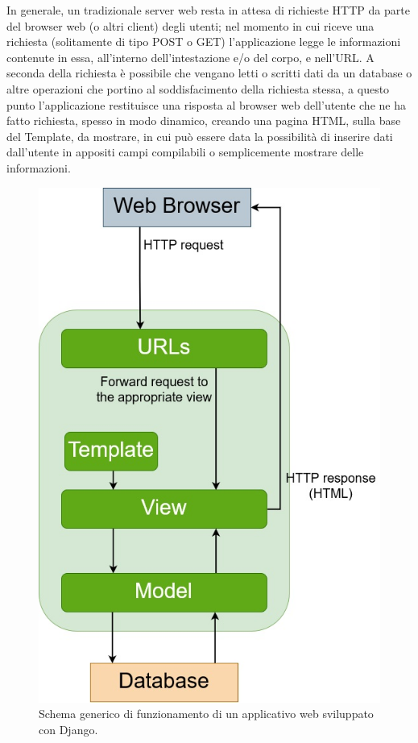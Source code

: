 In generale, un tradizionale server web resta in attesa di richieste HTTP da parte del browser web (o altri client) degli utenti; nel momento in cui riceve 
una richiesta (solitamente di tipo POST o GET) 
l'applicazione legge le informazioni contenute in essa, all'interno dell'intestazione e/o del corpo, e nell'URL. A seconda della richiesta è possibile che 
vengano letti o scritti dati da un database o altre operazioni che portino al soddisfacimento della richiesta stessa, a questo punto l'applicazione restituisce una 
risposta al browser web dell'utente che ne ha fatto richiesta, spesso in modo dinamico, creando una pagina HTML, sulla base del Template,
da mostrare, in cui può essere data la possibilità di inserire dati dall'utente in appositi campi compilabili o semplicemente mostrare delle informazioni.
%
\begin{figure}[ht!]
    \centering
    \includegraphics[scale=0.5]{images/Django_doc.jpg}
    \caption[Schema di funzionamento di un applicativo web in Django]{Schema generico di funzionamento di un applicativo web sviluppato con Django.}
    \label{fig:django_doc}
\end{figure}
